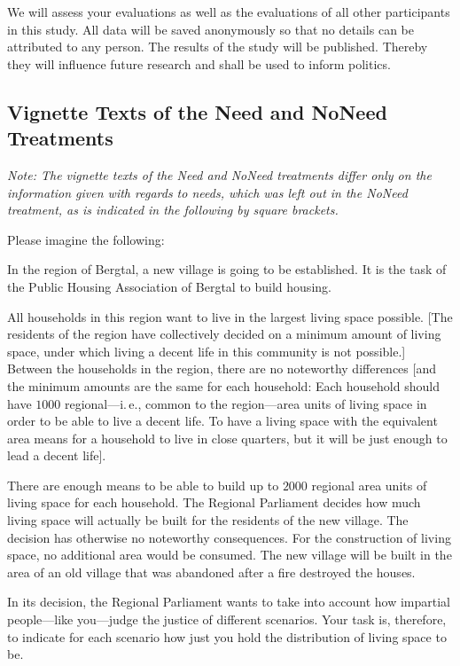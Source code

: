 \documentclass[12pt]{scrartcl}
\begin{document}
We will assess your evaluations as well as the evaluations of all other participants in this study.
All data will be saved anonymously so that no details can be attributed to any person.
The results of the study will be published.
Thereby they will influence future research and shall be used to inform politics.


\subsection*{Vignette Texts of the Need and NoNeed Treatments}
\textit{Note: The vignette texts of the Need and NoNeed treatments differ only on the information given with regards to needs, which was left out in the NoNeed treatment, as is indicated in the following by square brackets.}

\medskip{}
\noindent Please imagine the following:

In the region of Bergtal, a new village is going to be established.
It is the task of the Public Housing Association of Bergtal to build housing.

All households in this region want to live in the largest living space possible.
{[}The residents of the region have collectively decided on a minimum amount of living space, under which living a decent life in this community is not possible.{]}
Between the households in the region, there are no noteworthy differences {[}and the minimum amounts are the same for each household: Each household should have $1000$ regional---i.\,e., common to the region---area units of living space in order to be able to live a decent life.
To have a living space with the equivalent area means for a household to live in close quarters, but it will be just enough to lead a decent life{]}.

There are enough means to be able to build up to $2000$ regional area units of living space for each household.
The Regional Parliament decides how much living space will actually be built for the residents of the new village.
The decision has otherwise no noteworthy consequences.
For the construction of living space, no additional area would be consumed.
The new village will be built in the area of an old village that was abandoned after a fire destroyed the houses.

In its decision, the Regional Parliament wants to take into account how impartial people---like you---judge the justice of different scenarios.
Your task is, therefore, to indicate for each scenario how just you hold the distribution of living space to be.
\end{document}
